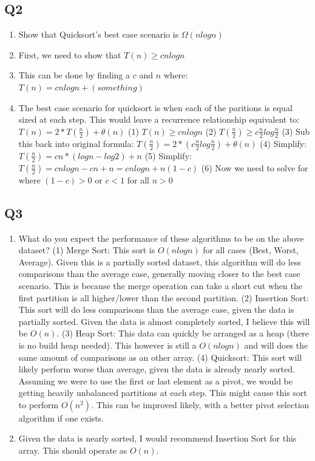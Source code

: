 \documentclass{article}
\begin{document}
\subsection*{Q2}
\begin{enumerate}[label=(\alph*)]
    \item Show that Quicksort's best case scenario is $\Omega(nlogn)$
    \item First, we need to show that $T(n) \geq cnlogn$
    \item This can be done by finding a $c$ and $n$ where: $T(n) = cnlogn + (something)$
    \item The best case scenario for quicksort is when each of the paritions is equal sized at each step. This would leave a recurrence relationship equivalent to: $T(n) = 2* T(\frac{n}{2}) + \theta(n)$
    \subitem (1) $T(n) \geq cnlogn$
    \subitem (2) $T(\frac{n}{2}) \geq c\frac{n}{2}log\frac{n}{2}$
    \subitem (3) Sub this back into original formula: $T(\frac{n}{2}) = 2*(c\frac{n}{2}log\frac{n}{2}) + \theta(n)$
    \subitem (4) Simplify: $T(\frac{n}{2}) = cn * (logn - log2) + n$
    \subitem (5) Simplify: $T(\frac{n}{2}) = cnlogn - cn + n = cnlogn + n(1-c)$
    \subitem (6) Now we need to solve for where $(1-c) > 0$ or $c < 1$ for all $n>0$

\end{enumerate}

\subsection*{Q3}
\begin{enumerate}[label=(\alph*)]
    \item What do you expect the performance of these algorithms to be on the above dataset?
    \subitem (1) Merge Sort: This sort is $O(nlogn)$ for all cases (Best, Worst, Average). Given this is a partially sorted dataset, this algorithm will do less comparisons than the average case, generally moving closer to the best case scenario. This is because the merge operation can take a short cut when the first partition is all higher/lower than the second partition.
    \subitem (2) Insertion Sort: This sort will do less comparisons than the average case, given the data is partially sorted. Given the data is almost completely sorted, I believe this will be $O(n)$.
    \subitem (3) Heap Sort: This data can quickly be arranged as a heap (there is no build heap needed). This however is still a $O(nlogn)$ and will does the same amount of comparisons as an other array.
    \subitem (4) Quicksort: This sort will likely perform worse than average, given the data is already nearly sorted. Assuming we were to use the first or last element as a pivot, we would be getting heavily unbalanced partitions at each step. This might cause this sort to perform $O(n^2)$. This can be improved likely, with a better pivot selection algorithm if one exists.
    \item Given the data is nearly sorted, I would recommend Insertion Sort for this array. This should operate as $O(n)$.

\end{enumerate}
\end{document}
